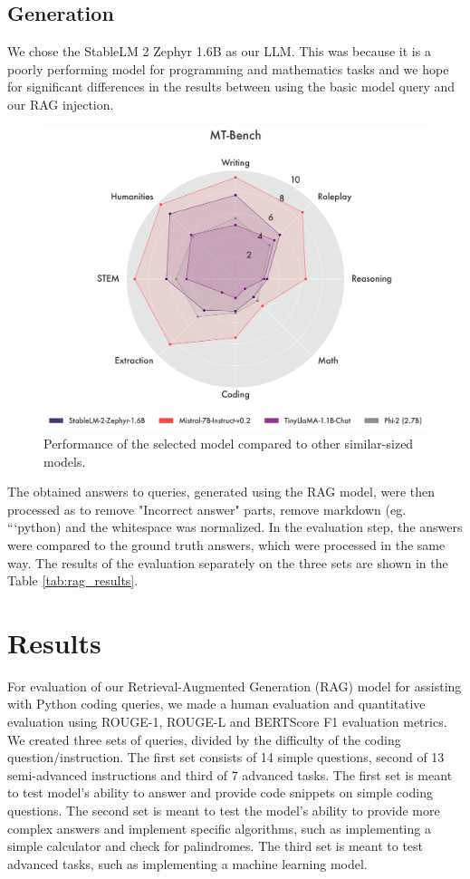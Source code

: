 \documentclass[fleqn,moreauthors,10pt]{ds_report}
\begin{document}
\subsection*{Generation}
We chose the StableLM 2 Zephyr 1.6B \cite{stabilityAI} as our LLM. This was because it is a poorly performing model for programming and mathematics tasks and we hope for significant differences in the results between using the basic model query and our RAG injection. 
\begin{figure}[h]
    \centering
    \includegraphics[width=0.8\linewidth]{fig/QH00HVM3lg-5f17U_py4K.png}
    \caption{Performance of the selected model compared to other similar-sized models.}
    \label{fig:example} %
\end{figure}


The obtained answers to queries, generated using the RAG model, were then processed as to remove "Incorrect answer" parts, remove markdown (eg. ```python) and the whitespace was normalized. In the evaluation step, the answers were compared to the ground truth answers, which were processed in the same way. The results of the evaluation separately on the three sets are shown in the Table \ref{tab:rag_results}. 


\section*{Results}
For evaluation of our Retrieval-Augmented Generation (RAG) model for assisting with Python coding queries, we made a human evaluation and quantitative evaluation using ROUGE-1, ROUGE-L and BERTScore F1 evaluation metrics. We created three sets of queries, divided by the difficulty of the coding question/instruction. The first set consists of 14 simple questions, second of 13 semi-advanced instructions and third of 7 advanced tasks. The first set is meant to test model's ability to answer and provide code snippets on simple coding questions. The second set is meant to test the model's ability to provide more complex answers and implement specific algorithms, such as implementing a simple calculator and check for palindromes. The third set is meant to test advanced tasks, such as implementing a machine learning model. 
\end{document}
